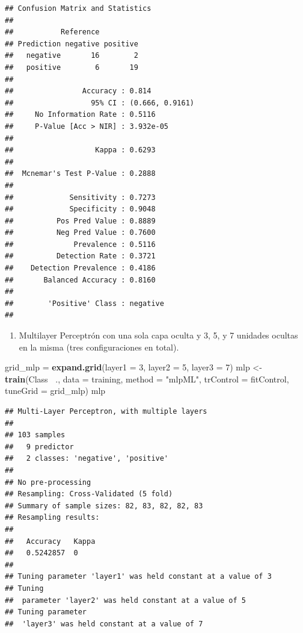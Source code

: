 \documentclass[]{article}
\newenvironment{Shaded}{\begin{snugshade}}{\end{snugshade}}
\newcommand{\DataTypeTok}[1]{\textcolor[rgb]{0.13,0.29,0.53}{#1}}
\newcommand{\DecValTok}[1]{\textcolor[rgb]{0.00,0.00,0.81}{#1}}
\newcommand{\KeywordTok}[1]{\textcolor[rgb]{0.13,0.29,0.53}{\textbf{#1}}}
\newcommand{\NormalTok}[1]{#1}
\newcommand{\OperatorTok}[1]{\textcolor[rgb]{0.81,0.36,0.00}{\textbf{#1}}}
\newcommand{\StringTok}[1]{\textcolor[rgb]{0.31,0.60,0.02}{#1}}
\providecommand{\tightlist}{%
  \setlength{\itemsep}{0pt}\setlength{\parskip}{0pt}}
\begin{document}
\begin{verbatim}
## Confusion Matrix and Statistics
## 
##           Reference
## Prediction negative positive
##   negative       16        2
##   positive        6       19
##                                          
##                Accuracy : 0.814          
##                  95% CI : (0.666, 0.9161)
##     No Information Rate : 0.5116         
##     P-Value [Acc > NIR] : 3.932e-05      
##                                          
##                   Kappa : 0.6293         
##                                          
##  Mcnemar's Test P-Value : 0.2888         
##                                          
##             Sensitivity : 0.7273         
##             Specificity : 0.9048         
##          Pos Pred Value : 0.8889         
##          Neg Pred Value : 0.7600         
##              Prevalence : 0.5116         
##          Detection Rate : 0.3721         
##    Detection Prevalence : 0.4186         
##       Balanced Accuracy : 0.8160         
##                                          
##        'Positive' Class : negative       
## 
\end{verbatim}

\begin{enumerate}
\def\labelenumi{\arabic{enumi}.}
\setcounter{enumi}{2}
\tightlist
\item
  Multilayer Perceptrón con una sola capa oculta y 3, 5, y 7 unidades
  ocultas en la misma (tres configuraciones en total).
\end{enumerate}

\begin{Shaded}
\begin{Highlighting}[]
\NormalTok{grid_mlp =}\StringTok{ }\KeywordTok{expand.grid}\NormalTok{(}\DataTypeTok{layer1 =} \DecValTok{3}\NormalTok{, }\DataTypeTok{layer2 =} \DecValTok{5}\NormalTok{, }\DataTypeTok{layer3 =} \DecValTok{7}\NormalTok{)}
\NormalTok{mlp <-}\StringTok{ }\KeywordTok{train}\NormalTok{(Class }\OperatorTok{~}\NormalTok{., }\DataTypeTok{data =}\NormalTok{ training,}
             \DataTypeTok{method =} \StringTok{"mlpML"}\NormalTok{,}
             \DataTypeTok{trControl =}\NormalTok{ fitControl,}
             \DataTypeTok{tuneGrid =}\NormalTok{ grid_mlp)}
\NormalTok{mlp}
\end{Highlighting}
\end{Shaded}

\begin{verbatim}
## Multi-Layer Perceptron, with multiple layers 
## 
## 103 samples
##   9 predictor
##   2 classes: 'negative', 'positive' 
## 
## No pre-processing
## Resampling: Cross-Validated (5 fold) 
## Summary of sample sizes: 82, 83, 82, 82, 83 
## Resampling results:
## 
##   Accuracy   Kappa
##   0.5242857  0    
## 
## Tuning parameter 'layer1' was held constant at a value of 3
## Tuning
##  parameter 'layer2' was held constant at a value of 5
## Tuning parameter
##  'layer3' was held constant at a value of 7
\end{verbatim}
\end{document}
